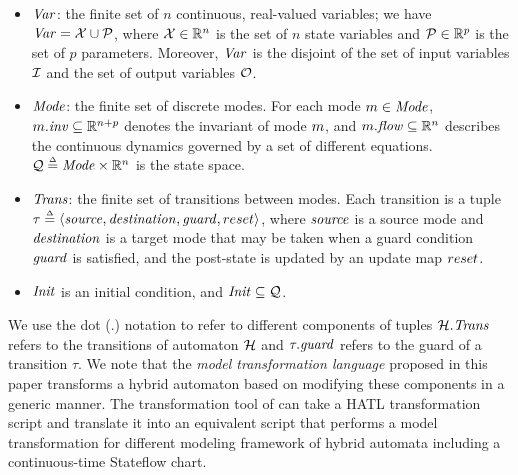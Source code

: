 %
\begin{itemize}[leftmargin= 2em]
%
\item ${\mathit{Var}}$: the finite set of $n$ continuous, real-valued variables; we have ${\mathit{Var}} = {\mathcal X} \cup {\mathcal P}$, where ${\mathcal X} \in \mathbb{R}^n$ is the set of $n$ state variables and ${\mathcal P}\in\mathbb{R}^p$ is the set of $p$ parameters. Moreover, ${\mathit{Var}}$ is the disjoint of the set of input variables ${\mathcal I}$ and the set of output variables ${\mathcal O}$.
\item ${\mathit{Mode}}$: the finite set of discrete modes. For each mode $m \in {\mathit{Mode}}$, $m.{\mathit{inv}} \subseteq \mathbb{R}^{n+p}$ denotes the invariant of mode $m$, and $m.{\mathit{flow}} \subseteq \mathbb{R}^n$ describes the continuous dynamics governed by a set of different equations. ${\mathcal Q} \mathrel{\stackrel{\scriptscriptstyle\Delta}{=}} {\mathit{Mode}} \times \mathbb{R}^n$ is the state space.
\item ${\mathit{Trans}}$: the finite set of transitions between modes.
%
Each transition is a tuple $\tau \mathrel{\stackrel{\scriptscriptstyle\Delta}{=}} \left\langle\mathit{source}, \mathit{destination}, \mathit{guard}, reset\right\rangle$, where $\mathit{source}$ is a source mode and $\mathit{destination}$ is a target mode that may be taken when a guard condition $\mathit{guard}$ is satisfied, and the post-state is updated by an update map $reset$.
%
%
%
\item ${\mathit{Init}}$ is an initial condition, and ${\mathit{Init}} \subseteq {\mathcal Q}$.
\end{itemize}
%
We use the dot (.) notation to refer to different components of tuples \eg ${\mathcal H}.{\mathit{Trans}}$ refers to the transitions of automaton ${\mathcal H}$ and $\tau.\mathit{guard}$ refers to the guard of a transition $\tau$. %
%
We note that the \emph{model transformation language} proposed in this paper transforms a hybrid automaton based on modifying these components in a generic manner. The transformation tool of \toolreaffirm can take a HATL transformation script and translate it into an equivalent script that performs a model transformation for different modeling framework of hybrid automata including a continuous-time Stateflow chart.
%

